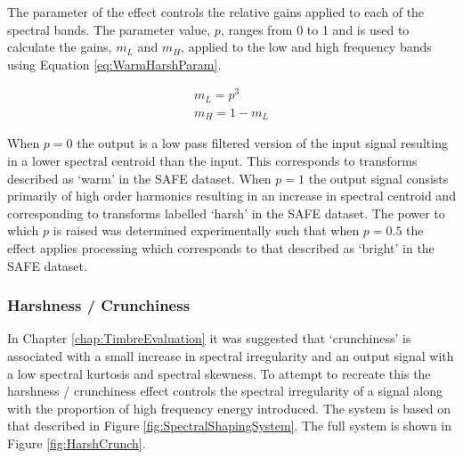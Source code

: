 			The parameter of the effect controls the relative gains applied to each of the spectral bands. The
			parameter value, $p$, ranges from 0 to 1 and is used to calculate the gains, $m_{L}$ and $m_{H}$,
			applied to the low and high frequency bands using Equation \ref{eq:WarmHarshParam}.

			\begin{gather}
				m_{L} = p^{3} \nonumber \\
				m_{H} = 1 - m_{L}
				\label{eq:WarmHarshParam}
			\end{gather}

			When $p = 0$  the output is a low pass filtered version of the input signal resulting in a lower
			spectral centroid than the input. This corresponds to transforms  described as `warm' in the SAFE
			dataset. When $p = 1$ the output signal consists primarily of high order harmonics resulting in an
			increase in spectral centroid and corresponding to transforms labelled `harsh' in the SAFE dataset.
			The power to which $p$ is raised was determined experimentally such that when $p = 0.5$ the effect
			applies processing which corresponds to that described as `bright' in the SAFE dataset. 

		\subsubsection*{Harshness / Crunchiness}
			In Chapter \ref{chap:TimbreEvaluation} it was suggested that `crunchiness' is associated with a
			small increase in spectral irregularity and an output signal with a low spectral kurtosis and
			spectral skewness. To attempt to recreate this the harshness / crunchiness effect controls the
			spectral irregularity of a signal along with the proportion of high frequency energy introduced.
			The system is based on that described in Figure \ref{fig:SpectralShapingSystem}. The full system is
			shown in Figure \ref{fig:HarshCrunch}.


